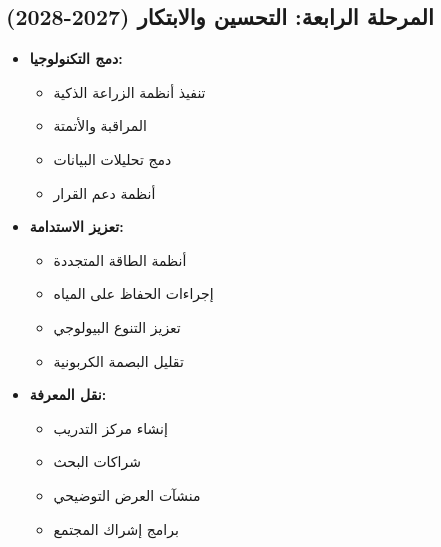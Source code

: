 \subsection{المرحلة الرابعة: التحسين والابتكار (2027-2028)}
\begin{itemize}
    \item \textbf{دمج التكنولوجيا:}
    \begin{itemize}
        \item تنفيذ أنظمة الزراعة الذكية
        \item المراقبة والأتمتة
        \item دمج تحليلات البيانات
        \item أنظمة دعم القرار
    \end{itemize}
    
    \item \textbf{تعزيز الاستدامة:}
    \begin{itemize}
        \item أنظمة الطاقة المتجددة
        \item إجراءات الحفاظ على المياه
        \item تعزيز التنوع البيولوجي
        \item تقليل البصمة الكربونية
    \end{itemize}
    
    \item \textbf{نقل المعرفة:}
    \begin{itemize}
        \item إنشاء مركز التدريب
        \item شراكات البحث
        \item منشآت العرض التوضيحي
        \item برامج إشراك المجتمع
    \end{itemize}
\end{itemize}

